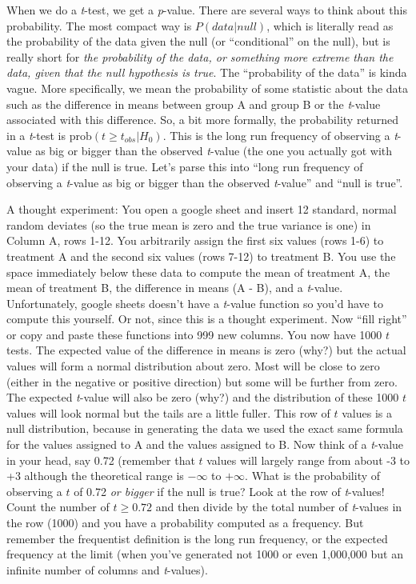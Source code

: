 \documentclass[]{book}
\begin{document}
When we do a \emph{t}-test, we get a \emph{p}-value. There are several ways to think about this probability. The most compact way is \(P(data | null)\), which is literally read as the probability of the data given the null (or ``conditional'' on the null), but is really short for \emph{the probability of the data, or something more extreme than the data, given that the null hypothesis is true}. The ``probability of the data'' is kinda vague. More specifically, we mean the probability of some statistic about the data such as the difference in means between group A and group B or the \emph{t}-value associated with this difference. So, a bit more formally, the probability returned in a \emph{t}-test is \(\mathrm{prob}(t \ge t_{obs} | H_0)\). This is the long run frequency of observing a \emph{t}-value as big or bigger than the observed \emph{t}-value (the one you actually got with your data) if the null is true. Let's parse this into ``long run frequency of observing a \emph{t}-value as big or bigger than the observed \emph{t}-value'' and ``null is true''.

A thought experiment: You open a google sheet and insert 12 standard, normal random deviates (so the true mean is zero and the true variance is one) in Column A, rows 1-12. You arbitrarily assign the first six values (rows 1-6) to treatment A and the second six values (rows 7-12) to treatment B. You use the space immediately below these data to compute the mean of treatment A, the mean of treatment B, the difference in means (A - B), and a \emph{t}-value. Unfortunately, google sheets doesn't have a \emph{t}-value function so you'd have to compute this yourself. Or not, since this is a thought experiment. Now ``fill right'' or copy and paste these functions into 999 new columns. You now have 1000 \(t\) tests. The expected value of the difference in means is zero (why?) but the actual values will form a normal distribution about zero. Most will be close to zero (either in the negative or positive direction) but some will be further from zero. The expected \emph{t}-value will also be zero (why?) and the distribution of these 1000 \(t\) values will look normal but the tails are a little fuller. This row of \(t\) values is a null distribution, because in generating the data we used the exact same formula for the values assigned to A and the values assigned to B. Now think of a \emph{t}-value in your head, say 0.72 (remember that \(t\) values will largely range from about -3 to +3 although the theoretical range is \(-\infty\) to \(+\infty\). What is the probability of observing a \(t\) of 0.72 \emph{or bigger} if the null is true? Look at the row of \emph{t}-values! Count the number of \(t \ge 0.72\) and then divide by the total number of \emph{t}-values in the row (1000) and you have a probability computed as a frequency. But remember the frequentist definition is the long run frequency, or the expected frequency at the limit (when you've generated not 1000 or even 1,000,000 but an infinite number of columns and \emph{t}-values).
\end{document}
